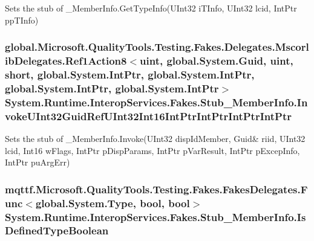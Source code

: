 Sets the stub of \-\_\-\-Member\-Info.\-Get\-Type\-Info(\-U\-Int32 i\-T\-Info, U\-Int32 lcid, Int\-Ptr pp\-T\-Info)

\hypertarget{class_system_1_1_runtime_1_1_interop_services_1_1_fakes_1_1_stub___member_info_a5e559ad6c74fafd83ae430087469da57}{
\subsubsection[{Invoke\-U\-Int32\-Guid\-Ref\-U\-Int32\-Int16\-Int\-Ptr\-Int\-Ptr\-Int\-Ptr\-Int\-Ptr}]{\setlength{\rightskip}{0pt plus 5cm}global.\-Microsoft.\-Quality\-Tools.\-Testing.\-Fakes.\-Delegates.\-Mscorlib\-Delegates.\-Ref1\-Action8$<$uint, global.\-System.\-Guid, uint, short, global.\-System.\-Int\-Ptr, global.\-System.\-Int\-Ptr, global.\-System.\-Int\-Ptr, global.\-System.\-Int\-Ptr$>$ System.\-Runtime.\-Interop\-Services.\-Fakes.\-Stub\-\_\-\-Member\-Info.\-Invoke\-U\-Int32\-Guid\-Ref\-U\-Int32\-Int16\-Int\-Ptr\-Int\-Ptr\-Int\-Ptr\-Int\-Ptr}}\label{class_system_1_1_runtime_1_1_interop_services_1_1_fakes_1_1_stub___member_info_a5e559ad6c74fafd83ae430087469da57}


Sets the stub of \-\_\-\-Member\-Info.\-Invoke(U\-Int32 disp\-Id\-Member, Guid\& riid, U\-Int32 lcid, Int16 w\-Flags, Int\-Ptr p\-Disp\-Params, Int\-Ptr p\-Var\-Result, Int\-Ptr p\-Excep\-Info, Int\-Ptr pu\-Arg\-Err)

\hypertarget{class_system_1_1_runtime_1_1_interop_services_1_1_fakes_1_1_stub___member_info_a054233ad0983ab6b99d368be408f23be}{
\subsubsection[{Is\-Defined\-Type\-Boolean}]{\setlength{\rightskip}{0pt plus 5cm}mqttf.\-Microsoft.\-Quality\-Tools.\-Testing.\-Fakes.\-Fakes\-Delegates.\-Func$<$global.\-System.\-Type, bool, bool$>$ System.\-Runtime.\-Interop\-Services.\-Fakes.\-Stub\-\_\-\-Member\-Info.\-Is\-Defined\-Type\-Boolean}}\label{class_system_1_1_runtime_1_1_interop_services_1_1_fakes_1_1_stub___member_info_a054233ad0983ab6b99d368be408f23be}


